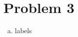 \documentclass[a4paper, 10pt, twoside]{article}
\begin{document}
\section*{Problem 3}

\begin{enumerate}[a)]
    \item labels
\end{enumerate}
\end{document}
